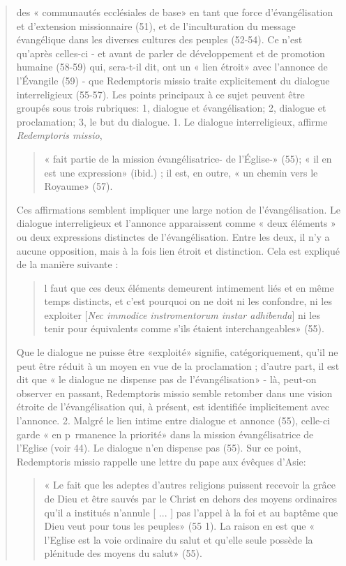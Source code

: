 \begin{quote}
des « communautés ecclésiales de base» en tant que
force d'évangélisation et d'extension missionnaire (51), et de
l'inculturation du message évangélique dans les diverses
cultures des peuples (52-54). Ce n'est qu'après celles-ci - et
avant de parler de développement et de promotion humaine
(58-59) qui, sera-t-il dit, ont un « lien étroit» avec l'annonce
de l'Évangile (59) - que Redemptoris missio traite explicitement
du dialogue interreligieux (55-57). Les points principaux
à ce sujet peuvent être groupés sous trois rubriques: 1, dialogue
et évangélisation; 2, dialogue et proclamation; 3, le but du
dialogue.
1. Le dialogue interreligieux, affirme \textit{Redemptoris missio},
\begin{quote}
  « fait partie de la mission évangélisatrice- de l'Église-» (55);
« il en est une expression» (ibid.) ; il est, en outre, « un chemin
vers le Royaume» (57).  
\end{quote}
 Ces affirmations semblent impliquer
une large notion de l'évangélisation. Le dialogue
interreligieux et l'annonce apparaissent comme « deux éléments
» ou deux expressions distinctes de l'évangélisation.
Entre les deux, il n'y a aucune opposition, mais à la fois lien
étroit et distinction. Cela est expliqué de la manière suivante :

\begin{quote}
    l faut que ces deux éléments demeurent intimement liés et en même temps distincts, et c'est pourquoi on ne doit ni les
confondre, ni les exploiter [\emph{Nec immodice instromentorum instar adhibenda}] ni les tenir pour équivalents comme s'ils
étaient interchangeables» (55).
\end{quote}
Que le dialogue ne puisse être «exploité» signifie, catégoriquement,
qu'il ne peut être réduit à un moyen en vue de la
proclamation ; d'autre part, il est dit que « le dialogue ne
dispense pas de l'évangélisation» - là, peut-on observer en
passant, Redemptoris missio semble retomber dans une vision
étroite de l'évangélisation qui, à présent, est identifiée implicitement
avec l'annonce.
2. Malgré le lien intime entre dialogue et annonce (55),
celle-ci garde « en p~rmanence la priorité» dans la mission
évangélisatrice de l'Eglise (voir 44). Le dialogue n'en dispense
pas (55). Sur ce point, Redemptoris missio rappelle une
lettre du pape aux évêques d'Asie: 
\begin{quote}
    « Le fait que les adeptes
d'autres religions puissent recevoir la grâce de Dieu et être
sauvés par le Christ en dehors des moyens ordinaires qu'il a
institués n'annule [ ... ] pas l'appel à la foi et au baptême que
Dieu veut pour tous les peuples» (55 1). La raison en est que
« l'Eglise est la voie ordinaire du salut et qu'elle seule possède
la plénitude des moyens du salut» (55).
\end{quote}


\end{quote}
